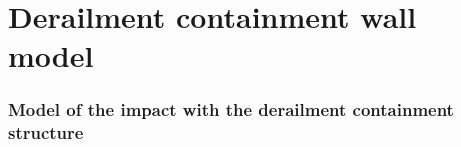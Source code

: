 \chapter{Derailment containment wall model}
\label{DCW}


\subsection{Model of the impact with the derailment containment structure}

